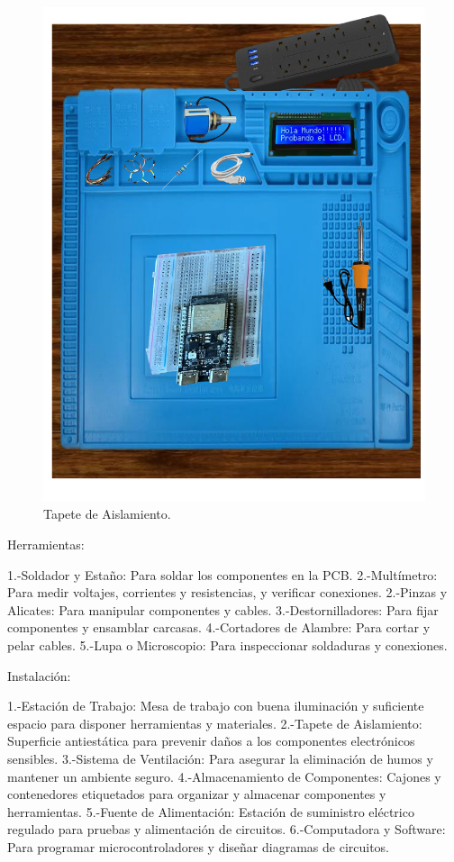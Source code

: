 \begin{itemize}
\begin{figure}[H]
        \includegraphics[scale=0.20]{1/img/Colocacion de Piezas.pdf}
        \caption{Tapete de Aislamiento.}
    \end{figure}
    \end{itemize}
    Herramientas:
    
    1.-Soldador y Estaño: Para soldar los componentes en la PCB.
    2.-Multímetro: Para medir voltajes, corrientes y resistencias, y verificar conexiones.
    2.-Pinzas y Alicates: Para manipular componentes y cables.
    3.-Destornilladores: Para fijar componentes y ensamblar carcasas.
    4.-Cortadores de Alambre: Para cortar y pelar cables.
    5.-Lupa o Microscopio: Para inspeccionar soldaduras y conexiones.
    
    Instalación:
    
    1.-Estación de Trabajo: Mesa de trabajo con buena iluminación y suficiente espacio para disponer herramientas y materiales.
    2.-Tapete de Aislamiento: Superficie antiestática para prevenir daños a los componentes electrónicos sensibles.
    3.-Sistema de Ventilación: Para asegurar la eliminación de humos y mantener un ambiente seguro.
    4.-Almacenamiento de Componentes: Cajones y contenedores etiquetados para organizar y almacenar componentes y herramientas.
    5.-Fuente de Alimentación: Estación de suministro eléctrico regulado para pruebas y alimentación de circuitos.
    6.-Computadora y Software: Para programar microcontroladores y diseñar diagramas de circuitos.
    
